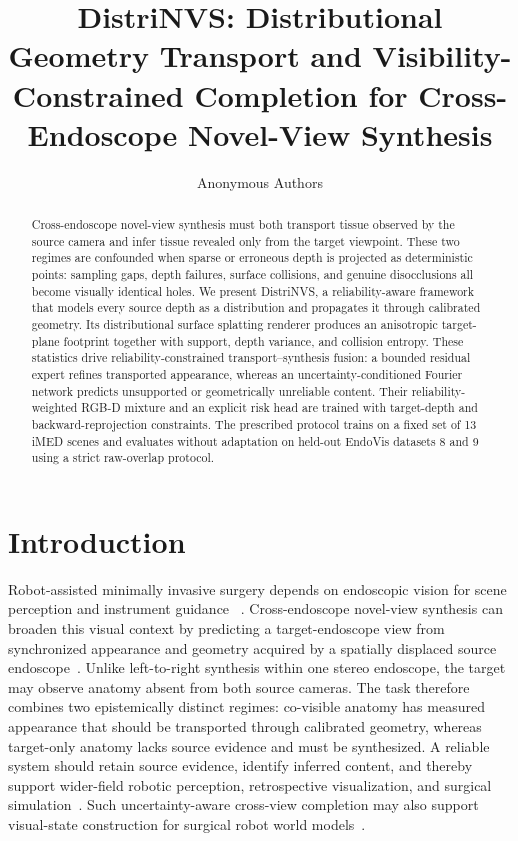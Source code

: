 \documentclass[letterpaper,10pt,conference]{ieeeconf}
\title{\LARGE \bf
DistriNVS: Distributional Geometry Transport and Visibility-Constrained Completion for Cross-Endoscope Novel-View Synthesis}
\author{Anonymous Authors}
\newcommand{\todo}[1]{\textcolor{todoRed}{\textbf{[TODO: #1]}}}
\begin{document}
\maketitle
\thispagestyle{empty}
\pagestyle{empty}

\begin{abstract}
Cross-endoscope novel-view synthesis must both transport tissue observed by
the source camera and infer tissue revealed only from the target viewpoint.
These two regimes are confounded when sparse or erroneous depth is projected
as deterministic points: sampling gaps, depth failures, surface collisions,
and genuine disocclusions all become visually identical holes. We present
DistriNVS, a reliability-aware framework that models every source depth as a
distribution and propagates it through calibrated geometry. Its
distributional surface splatting renderer produces an anisotropic target-plane
footprint together with support, depth variance, and collision entropy. These
statistics drive reliability-constrained transport--synthesis fusion: a bounded
residual expert refines transported appearance, whereas an
uncertainty-conditioned Fourier network predicts unsupported or geometrically
unreliable content. Their reliability-weighted RGB-D mixture and an explicit
risk head are trained with target-depth and backward-reprojection constraints.
The prescribed protocol trains on a fixed
set of 13 iMED scenes and evaluates without adaptation on held-out EndoVis
datasets 8 and 9 using a strict raw-overlap protocol. 
\end{abstract}

\section{Introduction}
\label{sec:introduction}

Robot-assisted minimally invasive surgery depends on endoscopic vision for
scene perception and instrument guidance
~\cite{wei2026roboticperception,sunmola2026surgicalgaussiansurfels}.
Cross-endoscope novel-view synthesis can broaden this visual context by
predicting a target-endoscope view from synchronized appearance and geometry
acquired by a spatially displaced source endoscope~\cite{wang2026endoe2egs}.
Unlike left-to-right synthesis within one stereo endoscope, the target may
observe anatomy absent from both source cameras. The task therefore combines
two epistemically distinct regimes: co-visible anatomy has measured appearance
that should be transported through calibrated geometry, whereas target-only
anatomy lacks source evidence and must be synthesized. A reliable system should
retain source evidence, identify inferred content, and thereby support
wider-field robotic perception, retrospective visualization, and surgical
simulation~\cite{hsieh2026extrags}.
Such uncertainty-aware cross-view completion may also support visual-state
construction for surgical robot world models~\cite{he2025surgworld}.
\end{document}

